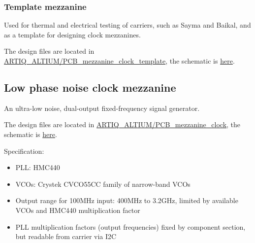\subsubsection{Template mezzanine}\label{template-mezzanine}

Used for thermal and electrical testing of carriers, such as Sayma and
Baikal, and as a template for designing clock mezzanines.

The design files are located in
\href{https://github.com/m-labs/sinara/tree/master/ARTIQ_ALTIUM/PCB_mezzanine_clock_template}{ARTIQ\_ALTIUM/PCB\_mezzanine\_clock\_template},
the schematic is
\href{https://github.com/m-labs/sinara/blob/master/ARTIQ_ALTIUM/PCB_mezzanine_clock_template/mezzanine_clock_template.PDF}{here}.

\subsection{Low phase noise clock mezzanine}\label{low-phase-noise-clock-mezzanine}

An ultra-low noise, dual-output fixed-frequency signal generator.

The design files are located in
\href{https://github.com/m-labs/sinara/tree/master/ARTIQ_ALTIUM/PCB_mezzanine_clock}{ARTIQ\_ALTIUM/PCB\_mezzanine\_clock},
the schematic is
\href{https://github.com/m-labs/sinara/blob/master/ARTIQ_ALTIUM/PCB_mezzanine_clock_template/mezzanine_clock_template.PDF}{here}.

Specification:

\begin{itemize}

	\item
	PLL: HMC440
	\item
	VCOs: Crystek CVCO55CC family of narrow-band VCOs
	\item
	Output range for 100MHz input: 400MHz to 3.2GHz, limited by available
	VCOs and HMC440 multiplication factor
	\item
	PLL multiplication factors (output frequencies) fixed by component
	section, but readable from carrier via I2C

\end{itemize}

%

